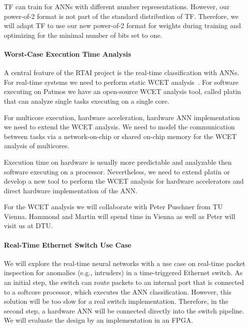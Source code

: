 \documentclass[fleqn,12pt]{article}
\begin{document}

TF can train for ANNs with different number
representations. However, our power-of-2 format is not part of the
standard distribution of TF.
Therefore, we will adapt TF to use our new power-of-2 format for weights
during training and optimizing for the minimal number of bits set to one.


\paragraph{Worst-Case Execution Time Analysis}

A central feature of the RTAI project is the real-time classification with ANNs.
For real-time systems we need to perform static WCET analysis~\cite{tecs:wcet:overview}.
For software executing on Patmos we have an open-source WCET analysis tool,
called platin~\cite{compiler:platin:kps15} that can analyze single tasks
executing on a single core.

For multicore execution, hardware acceleration, hardware ANN implementation
we need to extend the WCET analysis. We need to model the communication
between tasks via a network-on-chip or shared on-chip memory for the WCET
analysis of multicores.

Execution time on hardware is usually more predictable and analyzable then
software executing on a processor. Nevertheless, we need to extend platin or
develop a new tool to perform the WCET analysis for hardware accelerators
and direct hardware implementation of the ANN.

For the WCET analysis we will collaborate with Peter Puschner from TU Vienna.
Hammond and Martin will spend time in Vienna as well as Peter will visit
us at DTU.

\paragraph{Real-Time Ethernet Switch Use Case}

We will explore the real-time neural networks with a use case on real-time
packet inspection for anomalies (e.g., intruders) in a time-triggered Ethernet switch.
As an initial step, the switch can route packets to an internal port that is connected
to a softcore processor, which executes the ANN classification.
However, this solution will be too slow for a real switch implementation.
Therefore, in the second step, a hardware ANN will be connected directly
into the switch pipeline. We will evaluate the design by an implementation
in an FPGA.
\end{document}
